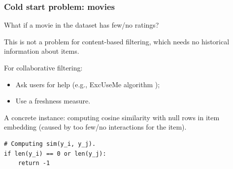 \documentclass[xcolor = {table}]{beamer}
\begin{document}
  \begin{frame}[fragile]
    \frametitle{Cold start problem: movies}

    What if a movie in the dataset has few/no ratings? 

    \vspace{1em}

    This is not a problem for content-based filtering, which needs no historical information about items.

    \vspace{1em}

    For collaborative filtering:

    \vspace{0.5em}

    \begin{itemize}
      \item Ask users for help (e.g., ExcUseMe algorithm \cite{useme});
      \item Use a freshness measure.
    \end{itemize}

    \vspace{0.5em}

    \pause

    A concrete instance: computing cosine similarity with null rows in item embedding (caused by too few/no interactions for the item).

    \vspace{0.5em}

    \begin{lstlisting}[basicstyle=\footnotesize]
# Computing sim(y_i, y_j).
if len(y_i) == 0 or len(y_j):
    return -1
    \end{lstlisting}



  \end{frame}
\end{document}
